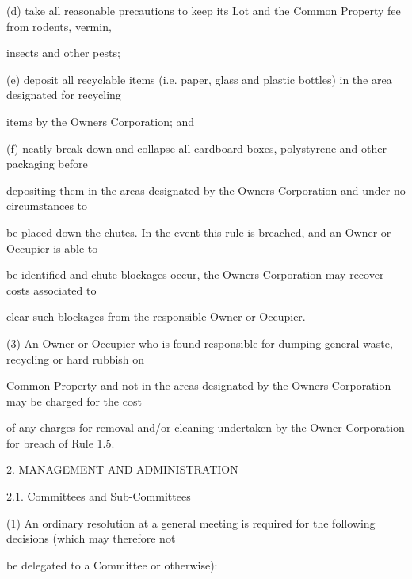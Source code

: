 \documentclass{article}
\begin{document}
{\fontsize{9.962}{1}(d) take all reasonable precautions to keep its Lot and the Common Property fee from rodents, vermin, }

{\fontsize{10.02}{1}insects and other pests; }

{\fontsize{9.962}{1}(e) deposit all recyclable items (i.e. paper, glass and plastic bottles) in the area designated for recycling }

{\fontsize{10.02}{1}items by the Owners Corporation; and }

{\fontsize{9.962}{1}(f) neatly break down and collapse all cardboard boxes, polystyrene and other packaging before }

{\fontsize{10.02}{1}depositing them in the areas designated by the Owners Corporation and under no circumstances to }

{\fontsize{10.02}{1}be placed down the chutes. In the event this rule is breached, and an Owner or Occupier is able to }

{\fontsize{10.02}{1}be identified and chute blockages occur, the Owners Corporation may recover costs associated to }

{\fontsize{10.02}{1}clear such blockages from the responsible Owner or Occupier. }

{\fontsize{9.962}{1}(3) An Owner or Occupier who is found responsible for dumping general waste, recycling or hard rubbish on }

{\fontsize{10.02}{1}Common Property and not in the areas designated by the Owners Corporation may be charged for the cost }

{\fontsize{10.02}{1}of any charges for removal and/or cleaning undertaken by the Owner Corporation for breach of Rule 1.5. }


\newpage


















{\fontsize{9.99}{1}2. MANAGEMENT AND ADMINISTRATION }

{\fontsize{9.99}{1}2.1. Committees and Sub-Committees }


{\fontsize{9.962}{1}(1) An ordinary resolution at a general meeting is required for the following decisions (which may therefore not }

{\fontsize{10.02}{1}be delegated to a Committee or otherwise): }
\end{document}
